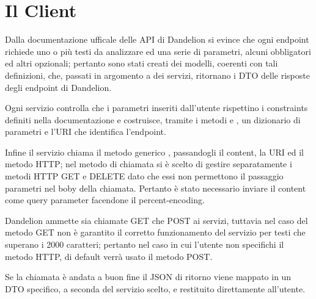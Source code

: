 \section{Il Client}

Dalla documentazione ufficale\cite{dandelion-doc} delle API di Dandelion si evince che ogni endpoint richiede uno o più testi da analizzare ed una serie di parametri, 
alcuni obbligatori ed altri opzionali; 
pertanto sono stati creati dei modelli, coerenti con tali definizioni, che, passati in argomento a dei servizi, ritornano i DTO delle risposte degli endpoint di Dandelion.

Ogni servizio controlla che i parametri inseriti dall'utente rispettino i constraints definiti nella documentazione e costruisce, tramite i metodi  e  
, un dizionario di parametri e l'URI che identifica l'endpoint. 

Infine il servizio chiama il metodo generico , passandogli il content, la URI ed il metodo HTTP; 
nel metodo di chiamata si è scelto di gestire separatamente i metodi HTTP GET e DELETE dato che essi non permettono il passaggio parametri nel boby 
della chiamata. Pertanto è stato necessario inviare il content come query parameter facendone il percent-encoding.

Dandelion ammette sia chiamate GET che POST ai servizi, tuttavia nel caso del metodo GET non è garantito il corretto 
funzionamento del servizio per testi che superano i 2000 caratteri; pertanto nel caso in cui l'utente non specifichi il metodo HTTP, di default verrà
usato il metodo POST.

Se la chiamata è andata a buon fine il JSON di ritorno viene mappato in un DTO specifico, a seconda del servizio scelto, e restituito direttamente all'utente.

